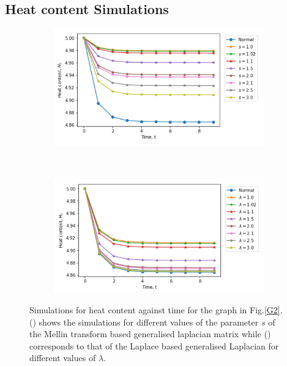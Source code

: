 \documentclass[10pt,a4paper]{article}
\begin{document}
    
    

  \subsection{Heat content Simulations}

    \begin{figure}[H]
    	\centering
    	\begin{subfigure}[b]{0.5\textwidth}
    		\includegraphics[width= \textwidth]{images/Mellin-heatcontent.png}
    		\caption{}
    		\label{mellin-heatcont}
    	\end{subfigure}~
    	\begin{subfigure}[b]{0.5\textwidth}
    		\includegraphics[width= \textwidth]{images/Laplace-heatcontent.png}
    		\caption{ }
    		\label{laplace-heatcont}
    	\end{subfigure}
    	\caption{Simulations for heat content against time for the graph in Fig.\ref{G2}. () shows the simulations for different values of the parameter $s$ of the Mellin transform based generalised laplacian matrix while () corresponds to that of the Laplace based generalised Laplacian for different values of $\lambda$. }
    	\label{}
    \end{figure}
 
\end{document}
